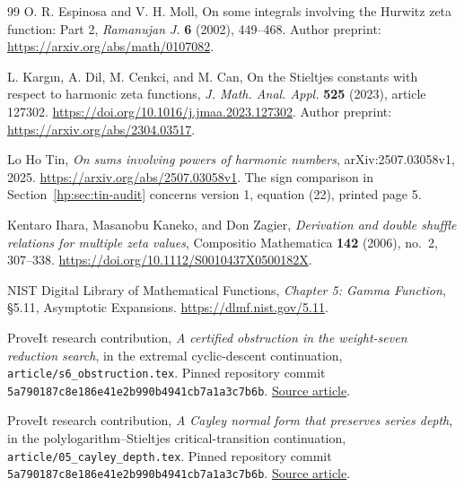 \documentclass[11pt,a4paper]{article}
\numberwithin{equation}{section}
\theoremstyle{definition}
\theoremstyle{remark}
\begin{document}
\begin{thebibliography}{99}
O. R. Espinosa and V. H. Moll,
On some integrals involving the Hurwitz zeta function: Part 2,
\emph{Ramanujan J.} \textbf{6} (2002), 449--468.
Author preprint: \url{https://arxiv.org/abs/math/0107082}.

L. Karg\i n, A. Dil, M. Cenkci, and M. Can,
On the Stieltjes constants with respect to harmonic zeta functions,
\emph{J. Math. Anal. Appl.} \textbf{525} (2023), article 127302.
\url{https://doi.org/10.1016/j.jmaa.2023.127302}.
Author preprint: \url{https://arxiv.org/abs/2304.03517}.


Lo Ho Tin,
\emph{On sums involving powers of harmonic numbers},
arXiv:2507.03058v1, 2025.
\url{https://arxiv.org/abs/2507.03058v1}.
The sign comparison in Section~\ref{hp:sec:tin-audit} concerns
version 1, equation (22), printed page 5.

Kentaro Ihara, Masanobu Kaneko, and Don Zagier,
\emph{Derivation and double shuffle relations for multiple zeta values},
Compositio Mathematica \textbf{142} (2006), no.~2, 307--338.
\url{https://doi.org/10.1112/S0010437X0500182X}.

NIST Digital Library of Mathematical Functions,
\emph{Chapter 5: Gamma Function}, \S5.11, Asymptotic Expansions.
\url{https://dlmf.nist.gov/5.11}.



ProveIt research contribution,
\emph{A certified obstruction in the weight-seven reduction search},
in the extremal cyclic-descent continuation,
\texttt{article/s6\_obstruction.tex}.
Pinned repository commit
\texttt{5a790187c8e186e41e2b990b4941cb7a1a3c7b6b}.
\href{https://github.com/VladimirReshetnikov/ProveIt/blob/5a790187c8e186e41e2b990b4941cb7a1a3c7b6b/Analysis/Polylogarithms/docs/reports/formal-reductions-continuation/continuations/extremal-cyclic-descent/article/s6_obstruction.tex}{Source article}.

ProveIt research contribution,
\emph{A Cayley normal form that preserves series depth},
in the polylogarithm--Stieltjes critical-transition continuation,
\texttt{article/05\_cayley\_depth.tex}.
Pinned repository commit
\texttt{5a790187c8e186e41e2b990b4941cb7a1a3c7b6b}.
\href{https://github.com/VladimirReshetnikov/ProveIt/blob/5a790187c8e186e41e2b990b4941cb7a1a3c7b6b/Analysis/Polylogarithms/docs/reports/uniform-transition-continuation/continuations/polylog-stieltjes-critical-transition/article/05_cayley_depth.tex}{Source article}.


\end{thebibliography}
\end{document}
